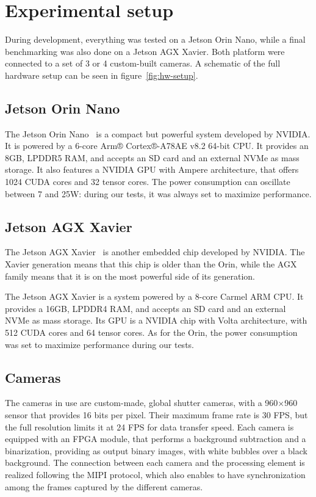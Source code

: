 \chapter{Experimental setup}
\label{chap:experim-setup}

During development, everything was tested on a Jetson Orin Nano, while a final benchmarking was also done on a Jetson AGX Xavier.
Both platform were connected to a set of 3 or 4 custom-built cameras.
A schematic of the full hardware setup can be seen in figure~\ref{fig:hw-setup}.

\section{Jetson Orin Nano}

The Jetson Orin Nano~\cite{jetson} is a compact but powerful system developed by NVIDIA.
It is powered by a 6-core Arm® Cortex®-A78AE v8.2 64-bit CPU.
It provides an 8GB, LPDDR5 RAM, and accepts an SD card and an external NVMe as mass storage.
It also features a NVIDIA GPU with Ampere architecture, that offers 1024 CUDA cores and 32 tensor cores.
The power consumption can oscillate between 7 and 25W: during our tests, it was always set to maximize performance.

\section{Jetson AGX Xavier}

The Jetson AGX Xavier~\cite{xavier} is another embedded chip developed by NVIDIA.
The Xavier generation means that this chip is older than the Orin, while the AGX family means that it is on the most powerful side of its generation.

The Jetson AGX Xavier is a system powered by a 8-core Carmel ARM CPU.
It provides a 16GB, LPDDR4 RAM, and accepts an SD card and an external NVMe as mass storage.
Its GPU is a NVIDIA chip with Volta architecture, with 512 CUDA cores and 64 tensor cores.
As for the Orin, the power consumption was set to maximize performance during our tests.

\section{Cameras}

The cameras in use are custom-made, global shutter cameras, with a 960{$\times$}960 sensor that provides 16 bits per pixel.
Their maximum frame rate is 30 FPS, but the full resolution limits it at 24 FPS for data transfer speed.
Each camera is equipped with an FPGA module, that performs a background subtraction and a binarization, providing as output binary images, with white bubbles over a black background.
The connection between each camera and the processing element is realized following the MIPI protocol, which also enables to have synchronization among the frames captured by the different cameras.

